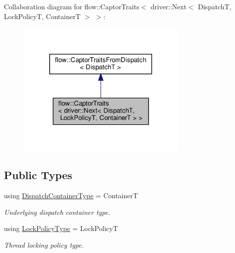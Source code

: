 Collaboration diagram for flow\+:\+:Captor\+Traits$<$ driver\+:\+:Next$<$ DispatchT, Lock\+PolicyT, ContainerT $>$ $>$\+:\nopagebreak
\begin{figure}[H]
\begin{center}
\leavevmode
\includegraphics[width=236pt]{structflow_1_1_captor_traits_3_01driver_1_1_next_3_01_dispatch_t_00_01_lock_policy_t_00_01_container_t_01_4_01_4__coll__graph}
\end{center}
\end{figure}
\subsection*{Public Types}
\begin{DoxyCompactItemize}
\item 
\mbox{\label{structflow_1_1_captor_traits_3_01driver_1_1_next_3_01_dispatch_t_00_01_lock_policy_t_00_01_container_t_01_4_01_4_a59438191776c122c7ebca696f38ab9bb}} 
using \hyperlink{structflow_1_1_captor_traits_3_01driver_1_1_next_3_01_dispatch_t_00_01_lock_policy_t_00_01_container_t_01_4_01_4_a59438191776c122c7ebca696f38ab9bb}{Dispatch\+Container\+Type} = ContainerT
\begin{DoxyCompactList}\small\item\em Underlying dispatch container type. \end{DoxyCompactList}\item 
\mbox{\label{structflow_1_1_captor_traits_3_01driver_1_1_next_3_01_dispatch_t_00_01_lock_policy_t_00_01_container_t_01_4_01_4_accd5a679c5ab27623e678f54557fbe78}} 
using \hyperlink{structflow_1_1_captor_traits_3_01driver_1_1_next_3_01_dispatch_t_00_01_lock_policy_t_00_01_container_t_01_4_01_4_accd5a679c5ab27623e678f54557fbe78}{Lock\+Policy\+Type} = Lock\+PolicyT
\begin{DoxyCompactList}\small\item\em Thread locking policy type. \end{DoxyCompactList}\end{DoxyCompactItemize}


